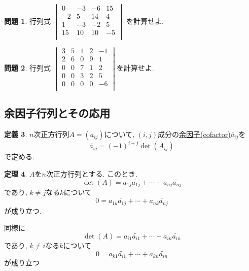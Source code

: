 \documentclass[dvipdfmx,a4paper,11pt]{article}
\theoremstyle{definition}
\newtheorem{thm}{定理}
\newtheorem{dfn}[thm]{定義}
\newtheorem{ques}[thm]{問題}
\begin{document}
\begin{ques}

行列式
$
\begin{vmatrix}
 0& -3& -6 &15 \\
 -2& 5& 14 &4 \\
 1& -3& -2 &5 \\
 15 & 10& 10 &-5 \\
 \end{vmatrix} 
 $
 を計算せよ.
\end{ques}

\begin{ques}
行列式
$
\begin{vmatrix}
3 & 5&1 & 2&-1\\
2 & 6&0 & 9&1\\
0 & 0& 7& 1&2\\
0 & 0& 3& 2&5\\
0 & 0& 0& 0&-6\\
\end{vmatrix}
$を計算せよ.

\end{ques}



 
\subsection{余因子行列とその応用 \cite[3.3節]{M}}


\begin{tcolorbox}[
    colback = white,
    colframe = green!35!black,
    fonttitle = \bfseries,
    breakable = true]
    \begin{dfn}
    $n$次正方行列$A=(a_{ij})$について, $(i,j)$成分の\underline{余因子(cofactor)}$\widetilde{a_{ij}}$を
$$
    \widetilde{a_{ij}}= (-1)^{i+j} \det(A_{ij})
    $$
    で定める.
    \end{dfn}
 \end{tcolorbox}

\begin{tcolorbox}[
    colback = white,
    colframe = green!35!black,
    fonttitle = \bfseries,
    breakable = true]
    \begin{thm}\cite[定理3.6]{M}
$A$を$n$次正方行列とする. このとき.
$$
 \det(A)  =a_{1j}\widetilde{a_{1j}}+ \cdots +a_{nj}\widetilde{a_{nj}}
$$
であり, $k \neq j$なる$k$について
$$
0 =a_{1k}\widetilde{a_{1j}}+ \cdots +a_{nk}\widetilde{a_{nj}}
$$
が成り立つ. 

同様に
$$
\det(A) =a_{i1}\widetilde{a_{i1}}+ \cdots +a_{in}\widetilde{a_{in}}
$$
であり, $k \neq i$なる$k$について
$$
0 =a_{k1}\widetilde{a_{i1}}+ \cdots +a_{kn}\widetilde{a_{in}}
$$
が成り立つ
      \end{thm}
 \end{tcolorbox}
  
\end{document}
